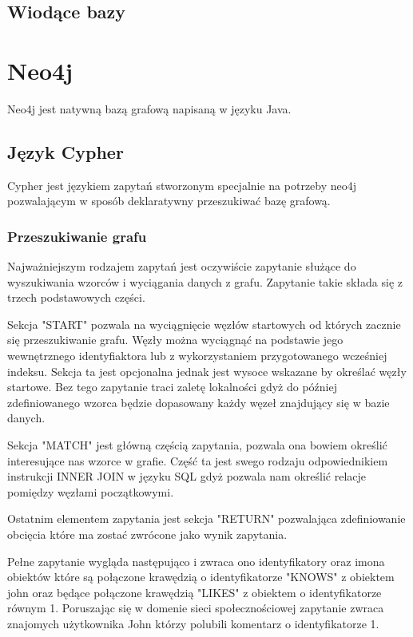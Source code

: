 \documentclass[brudnopis]{xmgr}
\begin{document}
\section{Wiodące bazy}

\chapter{Neo4j}

Neo4j jest natywną bazą grafową napisaną w języku Java. 

\section{Język Cypher}
Cypher jest językiem zapytań stworzonym specjalnie na potrzeby neo4j pozwalającym w sposób deklaratywny przeszukiwać bazę grafową.

\subsection{Przeszukiwanie grafu}

Najważniejszym rodzajem zapytań jest oczywiście zapytanie służące do wyszukiwania wzorców i wyciągania danych z grafu. Zapytanie takie składa się z trzech podstawowych części.

Sekcja "START" pozwala na wyciągnięcie węzłów startowych od których zacznie się przeszukiwanie grafu. Węzły można wyciągnąć na podstawie jego wewnętrznego identyfiaktora lub z wykorzystaniem przygotowanego wcześniej indeksu. Sekcja ta jest opcjonalna jednak jest wysoce wskazane by określać węzły startowe. Bez tego zapytanie traci zaletę lokalności gdyż do później zdefiniowanego wzorca będzie dopasowany każdy węzeł znajdujący się w bazie danych.



Sekcja "MATCH" jest główną częścią zapytania, pozwala ona bowiem określić interesujące nas wzorce w grafie. Część ta jest swego rodzaju odpowiednikiem instrukcji INNER JOIN w języku SQL gdyż pozwala nam określić relacje pomiędzy węzłami początkowymi.



Ostatnim elementem zapytania jest sekcja "RETURN" pozwalająca zdefiniowanie obcięcia które ma zostać zwrócone jako wynik zapytania.



Pełne zapytanie wygląda następująco i zwraca ono identyfikatory oraz imona obiektów które są połączone krawędzią o identyfikatorze "KNOWS" z obiektem john oraz będące połączone krawędzią "LIKES" z obiektem o identyfikatorze równym 1. Poruszając się w domenie sieci społecznościowej zapytanie zwraca znajomych użytkownika John którzy polubili komentarz o identyfikatorze 1.
\end{document}
